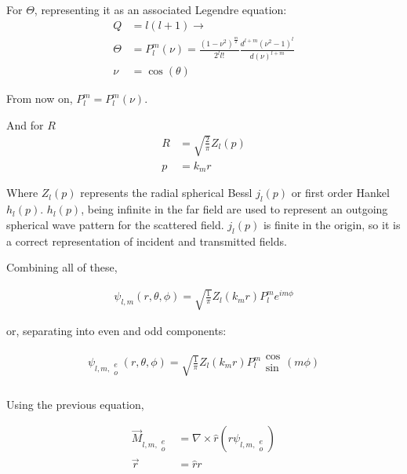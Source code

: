             For $\Theta$, representing it as an associated Legendre equation:
            \begin{align}
                Q &= l(l+1) \rightarrow \\
                \Theta &= P^m_l(\nu) = \frac{(1-\nu^2)^{\frac{m}{2}}}{2^l l!}\frac{d^{l+m}(\nu^2-1)^l}{d(\nu)^{l+m}} \\
                \nu &= \cos(\theta)
            \end{align}

            From now on, $P_l^m = P_l^m(\nu)$.

            And for $R$
            \begin{align}
                R &= \sqrt{\frac{2}{\pi}}Z_l(p) \\
                p &= k_m r
            \end{align}

            Where $Z_l(p)$ represents the radial spherical Bessl $j_l(p)$ or first order Hankel $h_l(p)$. $h_l(p)$, being infinite in
            the far field are used to represent an outgoing spherical wave pattern for the scattered field. $j_l(p)$ is finite in the
            origin, so it is a correct representation of incident and transmitted fields.

            Combining all of these,

            \begin{align}
                \psi_{l,m}(r, \theta, \phi) = \sqrt{\frac{1}{\pi}}Z_l(k_m r)P_l^m e^{im\phi}
            \end{align}

            or, separating into even and odd components:

            \begin{align}
                \psi_{l,m,\substack{e\\ o}}(r, \theta, \phi) = \sqrt{\frac{1}{\pi}}Z_l(k_m r)P_l^m \substack{\cos\\\sin}(m\phi)
            \end{align}

        \subsubsection{}

            Using the previous equation,

            \begin{align}
                \vec{M}_{l,m, \substack{e \\ o}} &= \nabla \times \hat{r}(r \psi_{l, m, \substack{e \\ o }})\\
                \vec{r} &= \hat{r}r
            \end{align}

